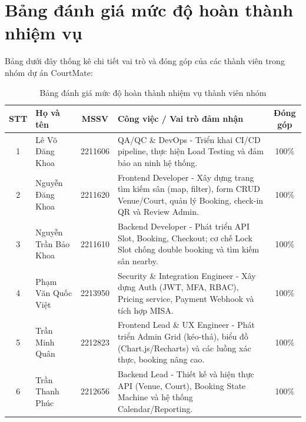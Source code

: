 \section*{Bảng đánh giá mức độ hoàn thành nhiệm vụ}
Bảng dưới đây thống kê chi tiết vai trò và đóng góp của các thành viên trong nhóm dự án CourtMate:

\begin{table}[H]
    \centering
    \renewcommand{\arraystretch}{1.3}
    \begin{tabularx}{\textwidth}{|c|p{3.5cm}|c|X|c|}
    \hline
    \textbf{STT} & \textbf{Họ và tên} & \textbf{MSSV} & \textbf{Công việc / Vai trò đảm nhận} & \textbf{Đóng góp} \\ \hline
    1 & Lê Võ Đăng Khoa & 2211606 & QA/QC \& DevOps - Triển khai CI/CD pipeline, thực hiện Load Testing và đảm bảo an ninh hệ thống. & 100\% \\ \hline
    2 & Nguyễn Đăng Khoa & 2211620 & Frontend Developer - Xây dựng trang tìm kiếm sân (map, filter), form CRUD Venue/Court, quản lý Booking, check-in QR và Review Admin. & 100\% \\ \hline
    3 & Nguyễn Trần Bảo Khoa & 2211610 & Backend Developer - Phát triển API Slot, Booking, Checkout; cơ chế Lock Slot chống double booking và tìm kiếm sân nearby. & 100\% \\ \hline
    4 & Phạm Văn Quốc Việt & 2213950 & Security \& Integration Engineer - Xây dựng Auth (JWT, MFA, RBAC), Pricing service, Payment Webhook và tích hợp MISA. & 100\% \\ \hline
    5 & Trần Minh Quân & 2212823 & Frontend Lead \& UX Engineer - Phát triển Admin Grid (kéo-thả), biểu đồ (Chart.js/Recharts) và các luồng xác thực, booking nâng cao. & 100\% \\ \hline
    6 & Trần Thanh Phúc & 2212656 & Backend Lead - Thiết kế và hiện thực API (Venue, Court), Booking State Machine và hệ thống Calendar/Reporting. & 100\% \\ \hline
    \end{tabularx}
    \caption{Bảng đánh giá mức độ hoàn thành nhiệm vụ thành viên nhóm}
    \label{tab:task_completion}
\end{table}